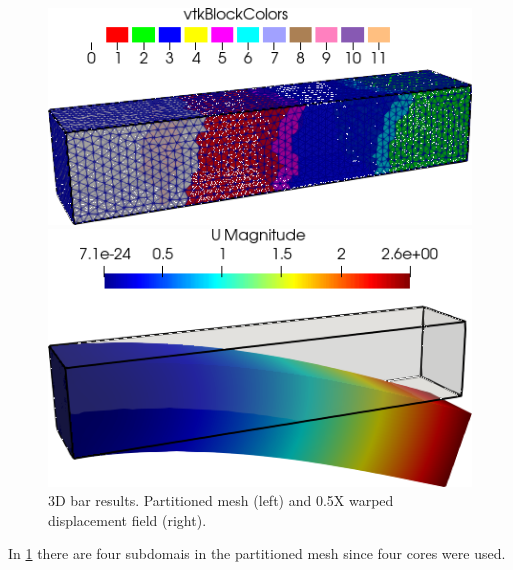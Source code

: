 \begin{figure}[htbp]
    \centering
    \begin{minipage}[t][2cm][t]{0.38\textwidth}
    \includegraphics[align=b,width=1\textwidth]{./Images/3d-bar-clamped-ends.png}
    \end{minipage}\hspace{.1\textwidth}
    \begin{minipage}[t][2cm][t]{0.4\textwidth}
    \includegraphics[align=b,width=1\textwidth]{./Images/3d-bar-clamped-pulled-partioned.png}
    \end{minipage}
    \caption{3D bar results. Partitioned mesh (left) and 0.5X warped displacement field (right).}
    \label{fig:3Dpart}
\end{figure}

In \cref{fig:3Dpart} there are four subdomais in the partitioned mesh
since four cores were used.
